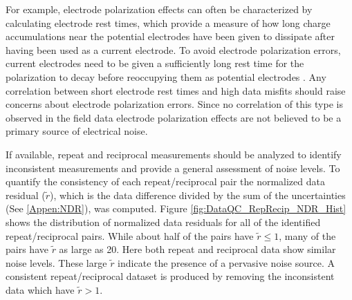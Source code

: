 \documentclass[final,authoryear,5p,times,twocolumn]{elsarticle}
\begin{document}
For example, electrode polarization effects can often be characterized by calculating electrode rest times, which provide a measure of how long charge accumulations near the potential electrodes have been given to dissipate after having been used as a current electrode. To avoid electrode polarization errors, current electrodes need to be given a sufficiently long rest time for the polarization to decay before reoccupying them as potential electrodes \citep{Dahlin2000,Merriam2005,Wilkinson2012}. Any correlation between short electrode rest times and high data misfits should raise concerns about electrode polarization errors. Since no correlation of this type is observed in the field data electrode polarization effects are not believed to be a primary source of electrical noise.

If available, repeat and reciprocal measurements should be analyzed to identify inconsistent measurements and provide a general assessment of noise levels. To quantify the consistency of each repeat/reciprocal pair the normalized data residual ($\tilde{r}$), which is the data difference divided by the sum of the uncertainties (See \ref{Appen:NDR}), was computed. Figure \ref{fig:DataQC_RepRecip_NDR_Hist} shows the distribution of normalized data residuals for all of the identified repeat/reciprocal pairs. While about half of the pairs have $\tilde{r} \leq 1$, many of the pairs have $\tilde{r}$ as large as 20. Here both repeat and reciprocal data show similar noise levels. These large $\tilde{r}$ indicate the presence of a pervasive noise source. A consistent repeat/reciprocal dataset is produced by removing the inconsistent data which have $\tilde{r} > 1$.
\end{document}
